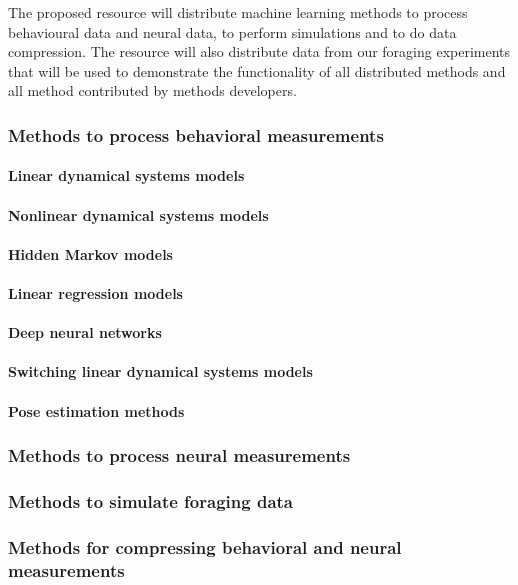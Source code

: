 The proposed resource will distribute machine learning methods to process
behavioural data and neural data, to perform simulations and to do data
compression. The resource will also distribute data from our foraging
experiments that will be used to demonstrate the functionality of all
distributed methods and all method contributed by methods developers.

\subsubsection{Methods to process behavioral measurements}

\paragraph{Linear dynamical systems models}

\paragraph{Nonlinear dynamical systems models}

\paragraph{Hidden Markov models}

\paragraph{Linear regression models}

\paragraph{Deep neural networks}

\paragraph{Switching linear dynamical systems models}

\paragraph{Pose estimation methods}


\subsubsection{Methods to process neural measurements}

\subsubsection{Methods to simulate foraging data}

\subsubsection{Methods for compressing behavioral and neural measurements}

